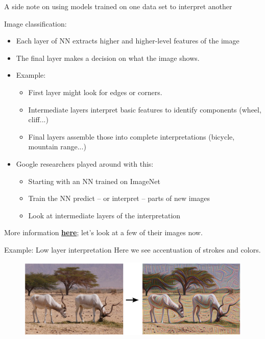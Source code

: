 \documentclass[mathserif, aspectratio=169]{beamer}
\begin{document}
\begin{frame}{A side note on using models trained on one data set to interpret another}

\pause

	Image classification:
	\begin{itemize}
		\item Each layer of NN extracts higher and higher-level features of the image
		\item The final layer makes a decision on what the image shows. 
		\item Example: 
		\begin{itemize}
			\item First layer might look for edges or corners. 
			\item Intermediate layers interpret basic features to identify components (wheel, cliff...)
			\item Final layers assemble those into complete interpretations (bicycle, mountain range...)
		\end{itemize}
		\item Google researchers played around with this:
		\begin{itemize}
			\item Starting with an NN trained on ImageNet
			\item Train the NN predict -- or interpret -- parts of new images
			\item Look at intermediate layers of the interpretation
		\end{itemize}
	\end{itemize}

	More information \href{https://ai.googleblog.com/2015/06/inceptionism-going-deeper-into-neural.html}{\textbf{here}}; let's look at a few of their images now.

\end{frame}

\begin{frame}{Example: Low layer interpretation}
Here we see accentuation of strokes and colors.
\begin{figure}
\includegraphics[width=\textwidth]{ibis_google}
\caption*{}
\end{figure}
\end{frame}
\end{document}
